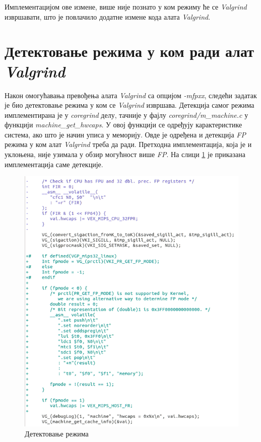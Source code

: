 \documentclass[12pt,oneside]{memoir}
\begin{document}
\indent Имплементацијом ове измене, више није познато у ком режиму ће се \textit{Valgrind} извршавати, што је повлачило додатне измене кода алата \textit{Valgrind}.

\section{Детектовање режима у ком ради алат \textit{Valgrind}}

\indent Након омогућавања превођења алата \textit{Valgrind} са опцијом \textit{-mfpxx}, следећи задатак је био детектовање режима у ком се \textit{Valgrind} извршава. Детекција самог режима имплементирана је у \textit{coregrind} делу, тачније у фајлу \textit{coregrind/m\_machine.c} у функцији \textit{machine\_get\_hwcaps}. У овој функцији се одређују карактеристике система, ако што је начин уписа у меморију. Овде је одређена и детекција \textit{FP} режима у ком алат \textit{Valgrind} треба да ради. Претходна имплементација, која је и уклоњена, није узимала у обзир могућност више \textit{FP}.
 На слици \ref{fig:detekcija} је приказана имплементација саме детекције.

\begin{figure}[h!]
\begin{center}
\includegraphics[scale=0.75]{slika27.png}
\end{center}
\caption{Детектовање режима}
\label{fig:detekcija}
\end{figure}
\end{document}
